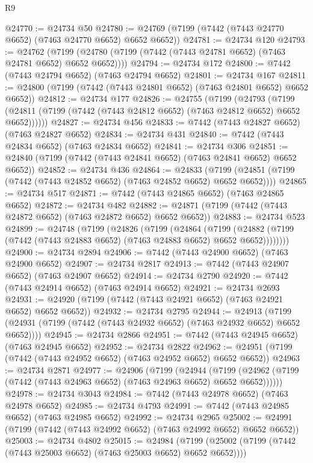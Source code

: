 \begin{lexlean}{R9}
\begin{coremodule}
{{{{{{{{{{{{{{{{{{{{{{{{{{{{{{{{{{{{{{{{{{{{{{{{{{{{{{{{{{{{{{{{{{{{{{{{{{{{{{{{{{{{@24770 := @24734 @50
@24780 := @24769 (@7199 (@7442 (@7443 @24770 @6652) (@7463 @24770 @6652) @6652 @6652))
@24781 := @24734 @120
@24793 := @24762
    (@7199 (@24780 (@7199 (@7442 (@7443 @24781 @6652) (@7463 @24781 @6652) @6652 @6652))))
@24794 := @24734 @172
@24800 := @7442 (@7443 @24794 @6652) (@7463 @24794 @6652)
@24801 := @24734 @167
@24811 := @24800 (@7199 (@7442 (@7443 @24801 @6652) (@7463 @24801 @6652) @6652 @6652))
@24812 := @24734 @177
@24826 := @24755
    (@7199
      (@24793
        (@7199 (@24811 (@7199 (@7442 (@7443 @24812 @6652) (@7463 @24812 @6652) @6652 @6652))))))
@24827 := @24734 @456
@24833 := @7442 (@7443 @24827 @6652) (@7463 @24827 @6652)
@24834 := @24734 @431
@24840 := @7442 (@7443 @24834 @6652) (@7463 @24834 @6652)
@24841 := @24734 @306
@24851 := @24840 (@7199 (@7442 (@7443 @24841 @6652) (@7463 @24841 @6652) @6652 @6652))
@24852 := @24734 @436
@24864 := @24833
    (@7199 (@24851 (@7199 (@7442 (@7443 @24852 @6652) (@7463 @24852 @6652) @6652 @6652))))
@24865 := @24734 @517
@24871 := @7442 (@7443 @24865 @6652) (@7463 @24865 @6652)
@24872 := @24734 @482
@24882 := @24871 (@7199 (@7442 (@7443 @24872 @6652) (@7463 @24872 @6652) @6652 @6652))
@24883 := @24734 @523
@24899 := @24748
    (@7199
      (@24826
        (@7199
          (@24864
            (@7199
              (@24882 (@7199 (@7442 (@7443 @24883 @6652) (@7463 @24883 @6652) @6652 @6652))))))))
@24900 := @24734 @2894
@24906 := @7442 (@7443 @24900 @6652) (@7463 @24900 @6652)
@24907 := @24734 @2817
@24913 := @7442 (@7443 @24907 @6652) (@7463 @24907 @6652)
@24914 := @24734 @2790
@24920 := @7442 (@7443 @24914 @6652) (@7463 @24914 @6652)
@24921 := @24734 @2693
@24931 := @24920 (@7199 (@7442 (@7443 @24921 @6652) (@7463 @24921 @6652) @6652 @6652))
@24932 := @24734 @2795
@24944 := @24913
    (@7199 (@24931 (@7199 (@7442 (@7443 @24932 @6652) (@7463 @24932 @6652) @6652 @6652))))
@24945 := @24734 @2866
@24951 := @7442 (@7443 @24945 @6652) (@7463 @24945 @6652)
@24952 := @24734 @2822
@24962 := @24951 (@7199 (@7442 (@7443 @24952 @6652) (@7463 @24952 @6652) @6652 @6652))
@24963 := @24734 @2871
@24977 := @24906
    (@7199
      (@24944
        (@7199 (@24962 (@7199 (@7442 (@7443 @24963 @6652) (@7463 @24963 @6652) @6652 @6652))))))
@24978 := @24734 @3043
@24984 := @7442 (@7443 @24978 @6652) (@7463 @24978 @6652)
@24985 := @24734 @4793
@24991 := @7442 (@7443 @24985 @6652) (@7463 @24985 @6652)
@24992 := @24734 @2965
@25002 := @24991 (@7199 (@7442 (@7443 @24992 @6652) (@7463 @24992 @6652) @6652 @6652))
@25003 := @24734 @4802
@25015 := @24984
    (@7199 (@25002 (@7199 (@7442 (@7443 @25003 @6652) (@7463 @25003 @6652) @6652 @6652))))
}}}}}}}}}}}}}}}}}}}}}}}}}}}}}}}}}}}}}}}}}}}}}}}}}}}}}}}}}}}}}}}}}}}}}}}}}}}}}}}}}}}}
\end{coremodule}
\end{lexlean}
